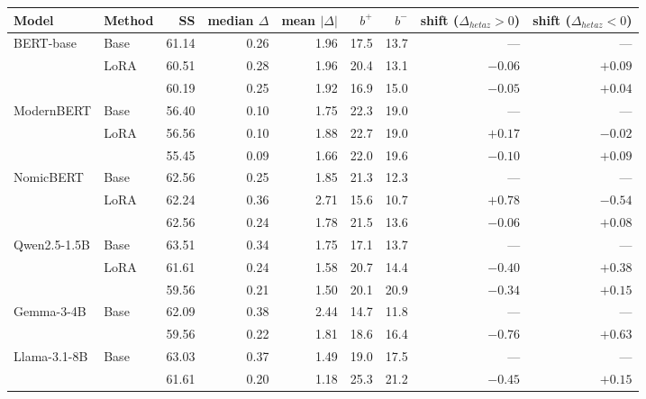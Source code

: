   \footnotesize\setlength{\tabcolsep}{4pt}
  \begin{tabular}{@{}llrrrrrrr@{}}
    \toprule
    Model & Method & SS & median $\Delta$ & mean $|\Delta|$ & $b^{+}$ & $b^{-}$ & shift ($\Delta_{	hetaz}>0$) & shift ($\Delta_{	hetaz}<0$) \\
    \midrule
    BERT-base & Base & 61.14 & 0.26 & 1.96 & 17.5 & 13.7 & --- & --- \\
     & LoRA & 60.51 & 0.28 & 1.96 & 20.4 & 13.1 & $-0.06$ & $+0.09$ \\
     & \PEAT{} & 60.19 & 0.25 & 1.92 & 16.9 & 15.0 & $-0.05$ & $+0.04$ \\
    \midrule
    ModernBERT & Base & 56.40 & 0.10 & 1.75 & 22.3 & 19.0 & --- & --- \\
     & LoRA & 56.56 & 0.10 & 1.88 & 22.7 & 19.0 & $+0.17$ & $-0.02$ \\
     & \PEAT{} & 55.45 & 0.09 & 1.66 & 22.0 & 19.6 & $-0.10$ & $+0.09$ \\
    \midrule
    NomicBERT & Base & 62.56 & 0.25 & 1.85 & 21.3 & 12.3 & --- & --- \\
     & LoRA & 62.24 & 0.36 & 2.71 & 15.6 & 10.7 & $+0.78$ & $-0.54$ \\
     & \PEAT{} & 62.56 & 0.24 & 1.78 & 21.5 & 13.6 & $-0.06$ & $+0.08$ \\
    \midrule
    Qwen2.5-1.5B & Base & 63.51 & 0.34 & 1.75 & 17.1 & 13.7 & --- & --- \\
     & LoRA & 61.61 & 0.24 & 1.58 & 20.7 & 14.4 & $-0.40$ & $+0.38$ \\
     & \PEAT{} & 59.56 & 0.21 & 1.50 & 20.1 & 20.9 & $-0.34$ & $+0.15$ \\
    \midrule
    Gemma-3-4B & Base & 62.09 & 0.38 & 2.44 & 14.7 & 11.8 & --- & --- \\
     & \PEAT{} & 59.56 & 0.22 & 1.81 & 18.6 & 16.4 & $-0.76$ & $+0.63$ \\
    \midrule
    Llama-3.1-8B & Base & 63.03 & 0.37 & 1.49 & 19.0 & 17.5 & --- & --- \\
     & \PEAT{} & 61.61 & 0.20 & 1.18 & 25.3 & 21.2 & $-0.45$ & $+0.15$ \\
    \bottomrule
  \end{tabular}
